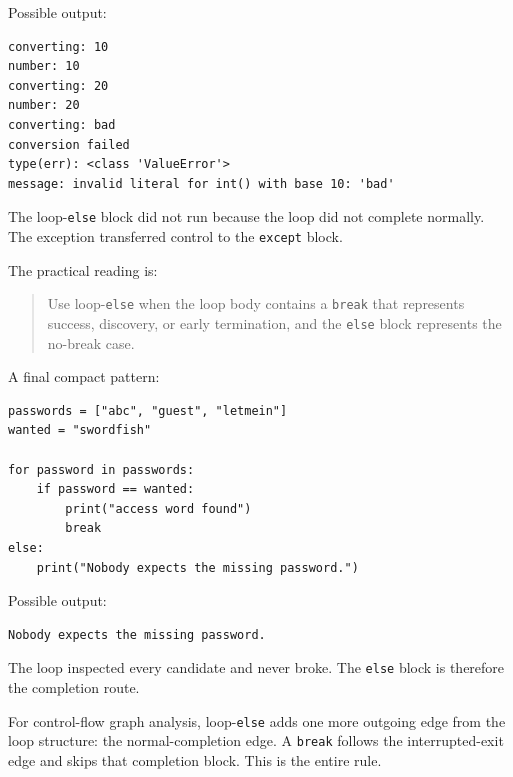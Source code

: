 Possible output:

\begin{verbatim}
converting: 10
number: 10
converting: 20
number: 20
converting: bad
conversion failed
type(err): <class 'ValueError'>
message: invalid literal for int() with base 10: 'bad'
\end{verbatim}

The loop-\texttt{else} block did not run because the loop did not complete normally. The exception transferred control to the \texttt{except} block.

The practical reading is:

\begin{quote}
Use loop-\texttt{else} when the loop body contains a \texttt{break} that represents success, discovery, or early termination, and the \texttt{else} block represents the no-break case.
\end{quote}

A final compact pattern:

\begin{verbatim}
passwords = ["abc", "guest", "letmein"]
wanted = "swordfish"

for password in passwords:
    if password == wanted:
        print("access word found")
        break
else:
    print("Nobody expects the missing password.")
\end{verbatim}

Possible output:

\begin{verbatim}
Nobody expects the missing password.
\end{verbatim}

The loop inspected every candidate and never broke. The \texttt{else} block is therefore the completion route.

For control-flow graph analysis, loop-\texttt{else} adds one more outgoing edge from the loop structure: the normal-completion edge. A \texttt{break} follows the interrupted-exit edge and skips that completion block. This is the entire rule.